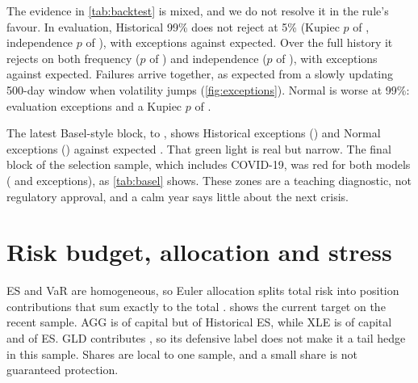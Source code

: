 \documentclass[11pt,a4paper]{article}
\begin{document}
\begin{table}[htb]\centering\caption{99\% coverage tests. Non-rejection is not proof of safety; sparse samples have low power.}\label{tab:backtest}\footnotesize\end{table}

The evidence in \cref{tab:backtest} is mixed, and we do not resolve it in the rule's favour. In evaluation, Historical 99\% does not reject at 5\% (Kupiec $p$ of \qeHsEvalUc{}, independence $p$ of \qeHsEvalInd{}), with \qeHsEvalExceptions{} exceptions against \qeHsEvalExpected{} expected. Over the full history it rejects on both frequency ($p$ of \qeHsFullUc{}) and independence ($p$ of \qeHsFullInd{}), with \qeHsFullExceptions{} exceptions against \qeHsFullExpected{} expected. Failures arrive together, as expected from a slowly updating 500-day window when volatility jumps (\cref{fig:exceptions}). Normal is worse at 99\%: \qeNormalEvalExceptions{} evaluation exceptions and a Kupiec $p$ of \qeNormalEvalUc{}.

\begin{table}[htb]\centering\caption{Educational Basel-style 99\% results for the final 250 sessions of each frozen sample.}\label{tab:basel}\small\end{table}

The latest Basel-style block, \qeBaselStart{} to \qeBaselEnd{}, shows \qeBaselHs{} Historical exceptions (\qeBaselHsZone{}) and \qeBaselNormal{} Normal exceptions (\qeBaselNormalZone{}) against \qeBaselExpected{} expected \citep{bcbs1996}. That green light is real but narrow. The final block of the selection sample, which includes COVID-19, was red for both models (\qeBaselSelHs{} and \qeBaselSelNormal{} exceptions), as \cref{tab:basel} shows. These zones are a teaching diagnostic, not regulatory approval, and a calm year says little about the next crisis.

\section{Risk budget, allocation and stress}
ES and VaR are homogeneous, so Euler allocation splits total risk into position contributions that sum exactly to the total \citep{tasche2008}.  shows the current target on the recent sample. AGG is \qeWeightAgg{} of capital but \qeShareAgg{} of Historical ES, while XLE is \qeWeightXle{} of capital and \qeShareXle{} of ES. GLD contributes \qeShareGld{}, so its defensive label does not make it a tail hedge in this sample. Shares are local to one sample, and a small share is not guaranteed protection.
\end{document}
